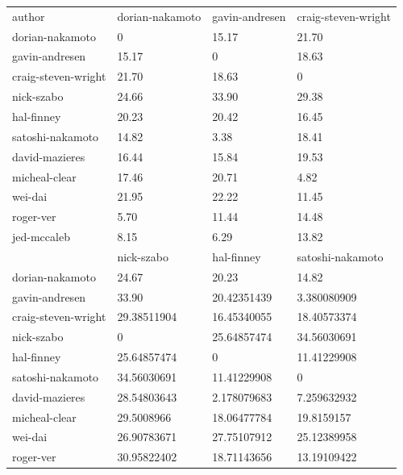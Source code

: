 \documentclass{article}%
\begin{document}
\begin{table}[]
\begin{tabular}{llll}
author              & dorian-nakamoto & gavin-andresen & craig-steven-wright \\
dorian-nakamoto     & 0               & 15.17    & 21.70         \\
gavin-andresen      & 15.17     & 0              & 18.63        \\
craig-steven-wright & 21.70    & 18.63    & 0                   \\
nick-szabo          & 24.66     & 33.90    & 29.38         \\
hal-finney          & 20.23     & 20.42   & 16.45        \\
satoshi-nakamoto    & 14.82     & 3.38    & 18.41         \\
david-mazieres      & 16.44     & 15.84     & 19.53         \\
micheal-clear       & 17.46     & 20.71     & 4.82          \\
wei-dai             & 21.95     & 22.22  & 11.45        \\
roger-ver           & 5.70    & 11.44    & 14.48        \\
jed-mccaleb         & 8.15     & 6.29    & 13.82        \\
                    & nick-szabo      & hal-finney     & satoshi-nakamoto    \\
dorian-nakamoto     & 24.67    & 20.23    & 14.82         \\
gavin-andresen      & 33.90     & 20.42351439    & 3.380080909         \\
craig-steven-wright & 29.38511904     & 16.45340055    & 18.40573374         \\
nick-szabo          & 0               & 25.64857474    & 34.56030691         \\
hal-finney          & 25.64857474     & 0              & 11.41229908         \\
satoshi-nakamoto    & 34.56030691     & 11.41229908    & 0                   \\
david-mazieres      & 28.54803643     & 2.178079683    & 7.259632932         \\
micheal-clear       & 29.5008966      & 18.06477784    & 19.8159157          \\
wei-dai             & 26.90783671     & 27.75107912    & 25.12389958         \\
roger-ver           & 30.95822402     & 18.71143656    & 13.19109422         \\

\end{tabular}
\end{table}
\end{document}
